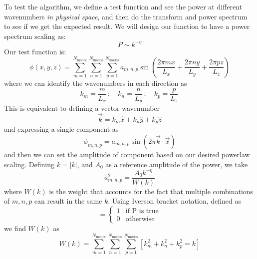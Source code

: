 \documentclass[11pt]{article}
\begin{document}
To test the algorithm, we define a test function and see the power at
different wavenumbers {\em in physical space}, and then do the transform
and power spectrum to see if we get the expected result.  We will design
our function to have a power spectrum scaling as:
\begin{equation}
P \sim k^{-\eta}
\end{equation}
Our test function
is:
\begin{equation}
\phi(x,y,z) = \sum_{m=1}^{N_\mathrm{modes}} 
              \sum_{n=1}^{N_\mathrm{modes}} 
              \sum_{p=1}^{N_\mathrm{modes}} 
     a_{m,n,p} \sin \left ( \frac{2\pi m x}{L_x} + 
                            \frac{2\pi n y}{L_y} + 
                            \frac{2\pi p z}{L_z} \right )
\end{equation}
where we can identify the wavenumbers in each direction as
\begin{equation}
k_m = \frac{m}{L_x} \, ; \quad 
k_n = \frac{n}{L_y} \, ; \quad 
k_p = \frac{p}{L_z} \,
\end{equation}
This is equivalent to defining a vector wavenumber
\begin{equation}
\vec{k} = k_m \hat{x} + k_n \hat{y} + k_p \hat{z}
\end{equation}
and expressing a single component as
\begin{equation}
\phi_{m,n,p} = a_{m,n,p} \sin(2\pi \vec{k}\cdot \vec{x})
\end{equation}
and then we can set the amplitude of component based on our desired
powerlaw scaling.  Defining $k = |k|$, and $A_0$ as a
reference amplitude of the power, we take
\begin{equation}
a_{m,n,p}^2 = \frac{A_0 k^{-\eta}}{W(k)}
\end{equation}
where $W(k)$ is the weight that accounts for the fact that multiple
combinations of $m, n, p$ can result in the same $k$.  Using Iverson bracket
notation, defined as
\begin{equation}
[P] = \begin{cases}
  1 & \text{if P is true} \\
  0 & \text{otherwise}
      \end{cases}
\end{equation}
we find $W(k)$ as
\begin{equation}
W(k) = \sum_{m=1}^{N_\mathrm{modes}}
       \sum_{n=1}^{N_\mathrm{modes}} 
       \sum_{p=1}^{N_\mathrm{modes}} [ k_m^2 + k_n^2 + k_p^2 = k ]
\end{equation}
\end{document}
